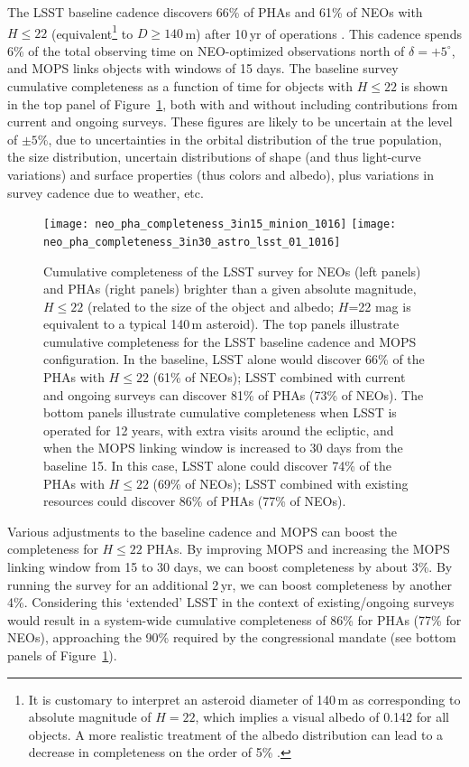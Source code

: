 The LSST baseline cadence discovers 66\% of PHAs and 61\% of NEOs with $H\leq22$
(equivalent\footnote{It is customary to interpret an asteroid diameter of 140\,m as corresponding to
absolute magnitude of $H=22$, which implies a visual albedo of 0.142 for all objects. A more
realistic treatment of the albedo distribution can lead to a decrease in completeness on the order
of 5\% \citep{2016AJ....151..172G,2016AJ....152...79W}.}  to $D\ge140$\,m)
after 10\,yr of operations \citep{2018Icar..303..181J}.  This cadence spends 6\% of the total
observing time on NEO-optimized observations north of $\delta = +5^\circ$, and MOPS links objects with windows of 15 days.
The baseline survey cumulative completeness as a function of time for objects with $H\le22$ is shown in the top panel of Figure~\ref{Fig:Cneo},
both with and without including contributions from current and
ongoing surveys. These figures are likely to be uncertain at the level of $\pm5\%$, due
to uncertainties in the orbital distribution of the true population, the size distribution, uncertain distributions of shape
(and thus light-curve variations) and surface properties (thus colors and albedo), plus variations in survey cadence due to
weather, etc.

\begin{figure}
\texttt{[image: neo\_pha\_completeness\_3in15\_minion\_1016]}
\texttt{[image: neo\_pha\_completeness\_3in30\_astro\_lsst\_01\_1016]}
\caption{Cumulative completeness of the LSST survey for NEOs (left panels) and PHAs (right panels)
brighter than a given absolute magnitude, $H\le22$ (related to the size of the object and albedo;
$H$=22 mag is equivalent to a typical 140\,m asteroid). The top panels illustrate cumulative completeness
for the LSST baseline cadence and MOPS configuration. In the baseline, LSST alone would discover 66\% of the PHAs
with $H\le22$ (61\% of NEOs); LSST combined with current and ongoing
surveys
can discover 81\% of PHAs (73\% of NEOs). The bottom panels illustrate cumulative
completeness when LSST is operated for 12 years, with extra visits around the ecliptic, and when the MOPS linking
window is increased to 30 days from the baseline 15. In this case, LSST alone could discover 74\% of the PHAs with
$H\le22$ (69\% of NEOs); LSST combined with existing resources could discover 86\% of PHAs (77\% of NEOs).
}
\label{Fig:Cneo}
\end{figure}

Various adjustments to the baseline cadence and MOPS can boost the completeness for $H\le22$ PHAs.
By improving MOPS and increasing the MOPS linking window from 15 to 30 days, we can boost completeness
by about 3\%. By running the survey for an additional 2\,yr, we can boost completeness by another 4\%.
Considering this `extended' LSST in the context of existing/ongoing surveys would result in a system-wide cumulative completeness of 86\% for PHAs (77\% for NEOs), approaching the 90\% required by the congressional mandate (see
bottom panels of Figure~\ref{Fig:Cneo}).


